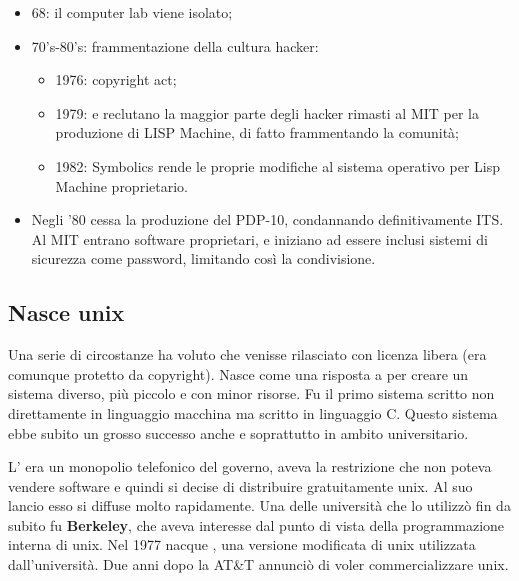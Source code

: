 \begin{itemize}

\item 68: il computer lab viene isolato;
\item 70's-80's: frammentazione della cultura hacker:

	\begin{itemize}

	\item 1976: copyright act;
	\item 1979:  e  reclutano la maggior parte degli hacker rimasti al MIT per la produzione di LISP Machine, di fatto frammentando la comunità;
	\item 1982: Symbolics rende le proprie modifiche al sistema operativo per Lisp Machine proprietario.
	
	\end{itemize}

\item Negli '80 cessa la produzione del PDP-10, condannando definitivamente ITS. Al MIT entrano software proprietari, e iniziano ad essere inclusi sistemi di sicurezza come password, limitando così la condivisione.

\end{itemize}

\subsection{Nasce unix}

Una serie di circostanze ha voluto che  venisse rilasciato con licenza libera (era comunque protetto da copyright). Nasce come una risposta a  per creare un sistema diverso, più piccolo e con minor risorse. Fu il primo sistema scritto non direttamente in linguaggio macchina ma scritto in linguaggio C. Questo sistema ebbe subito un grosso successo anche e soprattutto in ambito universitario. 

L' era un monopolio telefonico del governo, aveva la restrizione che non poteva vendere software e quindi si decise di distribuire gratuitamente unix. Al suo lancio esso si diffuse molto rapidamente. Una delle università che lo utilizzò fin da subito fu \textbf{Berkeley}, che aveva interesse dal punto di vista della programmazione interna di unix. Nel 1977 nacque , una versione modificata di unix utilizzata dall'università. Due anni dopo la AT\&T annunciò di voler commercializzare unix. 

